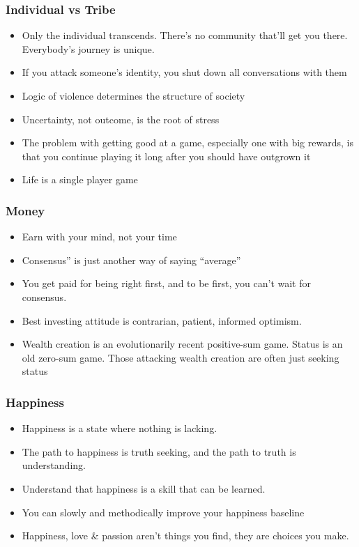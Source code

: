 \begin{frame}[fragile]\frametitle{ Individual vs Tribe}

\begin{itemize}
\item Only the individual transcends. There’s no community that’ll get you there. Everybody’s journey is unique.
\item If you attack someone’s identity, you shut down all conversations with them
\item Logic of violence determines the structure of society
\item Uncertainty, not outcome, is the root of stress
\item The problem with getting good at a game, especially one with big rewards, is that you continue playing it long after you should have outgrown it
\item Life is a single player game
\end{itemize}

\end{frame}

\begin{frame}[fragile]\frametitle{ Money}

\begin{itemize}
\item Earn with your mind, not your time
\item Consensus” is just another way of saying ``average''
\item You get paid for being right first, and to be first, you can’t wait for consensus.
\item Best investing attitude is contrarian, patient, informed optimism.
\item Wealth creation is an evolutionarily recent positive-sum game. Status is an old
zero-sum game. Those attacking wealth creation are often just seeking status
\end{itemize}

\end{frame}

\begin{frame}[fragile]\frametitle{ Happiness}

\begin{itemize}
\item Happiness is a state where nothing is lacking.
\item The path to happiness is truth seeking, and the path to truth is understanding.
\item Understand that happiness is a skill that can be learned.
\item You can slowly and methodically improve your happiness baseline
\item Happiness, love \& passion aren’t things you find, they are choices you make.
\end{itemize}

\end{frame}

